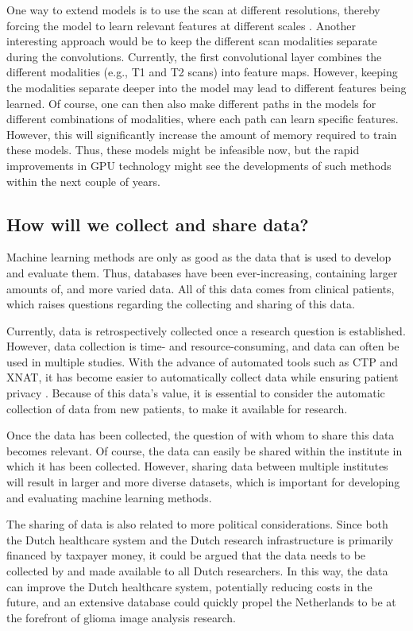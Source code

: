 One way to extend models is to use the scan at different resolutions, thereby forcing the model to learn relevant features at different scales \autocite{akkus2017predicting}.
Another interesting approach would be to keep the different scan modalities separate during the convolutions.
Currently, the first convolutional layer combines the different modalities (e.g., \acrlong{T1} and \acrlong{T2} scans) into feature maps.
However, keeping the modalities separate deeper into the model may lead to different features being learned.
Of course, one can then also make different paths in the models for different combinations of modalities, where each path can learn specific features.
However, this will significantly increase the amount of memory required to train these models.
Thus, these models might be infeasible now, but the rapid improvements in GPU technology might see the developments of such methods within the next couple of years.



\subsection{How will we collect and share data?}

Machine learning methods are only as good as the data that is used to develop and evaluate them.
Thus, databases have been ever-increasing, containing larger amounts of, and more varied data.
All of this data comes from clinical patients, which raises questions regarding the collecting and sharing of this data.

Currently, data is retrospectively collected once a research question is established.
However, data collection is time- and resource-consuming, and data can often be used in multiple studies.
With the advance of automated tools such as CTP and XNAT, it has become easier to automatically collect data while ensuring patient privacy \autocite{marcus2007extensible}.
Because of this data's value, it is essential to consider the automatic collection of data from new patients, to make it available for research.

Once the data has been collected, the question of with whom to share this data becomes relevant.
Of course, the data can easily be shared within the institute in which it has been collected.
However, sharing data between multiple institutes will result in larger and more diverse datasets, which is important for developing and evaluating machine learning methods.

The sharing of data is also related to more political considerations.
Since both the Dutch healthcare system and the Dutch research infrastructure is primarily financed by taxpayer money, it could be argued that the data needs to be collected by and made available to all Dutch researchers.
In this way, the data can improve the Dutch healthcare system, potentially reducing costs in the future, and an extensive database could quickly propel the Netherlands to be at the forefront of glioma image analysis research.

